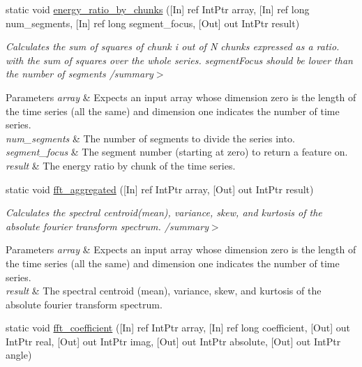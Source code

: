 \begin{DoxyCompactItemize}
static void \mbox{\hyperlink{classkhiva_1_1interop_1_1_d_l_l_features_a1840fee4dad604ae632bc8d1c7f06321}{energy\+\_\+ratio\+\_\+by\+\_\+chunks}} (\mbox{[}In\mbox{]} ref Int\+Ptr array, \mbox{[}In\mbox{]} ref long num\+\_\+segments, \mbox{[}In\mbox{]} ref long segment\+\_\+focus, \mbox{[}Out\mbox{]} out Int\+Ptr result)
\begin{DoxyCompactList}\small\item\em Calculates the sum of squares of chunk i out of N chunks expressed as a ratio. with the sum of squares over the whole series. segment\+Focus should be lower than the number of segments /summary$>$ 
\begin{DoxyParams}{Parameters}
{\em array} & Expects an input array whose dimension zero is the length of the time series (all the same) and dimension one indicates the number of time series.\\
\hline
{\em num\+\_\+segments} & The number of segments to divide the series into.\\
\hline
{\em segment\+\_\+focus} & The segment number (starting at zero) to return a feature on.\\
\hline
{\em result} & The energy ratio by chunk of the time series.\\
\hline
\end{DoxyParams}
\end{DoxyCompactList}\item 
static void \mbox{\hyperlink{classkhiva_1_1interop_1_1_d_l_l_features_a1c87c966c982ad8aa2c51478d509afe6}{fft\+\_\+aggregated}} (\mbox{[}In\mbox{]} ref Int\+Ptr array, \mbox{[}Out\mbox{]} out Int\+Ptr result)
\begin{DoxyCompactList}\small\item\em Calculates the spectral centroid(mean), variance, skew, and kurtosis of the absolute fourier transform spectrum. /summary$>$ 
\begin{DoxyParams}{Parameters}
{\em array} & Expects an input array whose dimension zero is the length of the time series (all the same) and dimension one indicates the number of time series.\\
\hline
{\em result} & The spectral centroid (mean), variance, skew, and kurtosis of the absolute fourier transform spectrum.\\
\hline
\end{DoxyParams}
\end{DoxyCompactList}\item 
static void \mbox{\hyperlink{classkhiva_1_1interop_1_1_d_l_l_features_a88800114f2e9afb24f1c6bcfa6ade957}{fft\+\_\+coefficient}} (\mbox{[}In\mbox{]} ref Int\+Ptr array, \mbox{[}In\mbox{]} ref long coefficient, \mbox{[}Out\mbox{]} out Int\+Ptr real, \mbox{[}Out\mbox{]} out Int\+Ptr imag, \mbox{[}Out\mbox{]} out Int\+Ptr absolute, \mbox{[}Out\mbox{]} out Int\+Ptr angle)

\end{DoxyCompactItemize}
